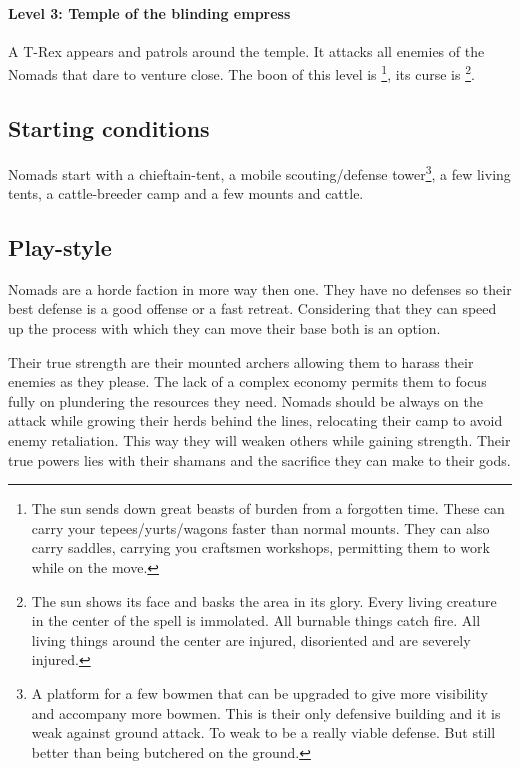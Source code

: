 \documentclass[a4paper]{book}
\begin{document}
			\paragraph{Level 3: Temple of the blinding empress}
				A T-Rex appears and patrols around the temple.
				It attacks all enemies of the \gls{Nomads} that dare to venture close.
				The boon of this level is \footnote{
					The sun sends down great beasts of burden from a forgotten time.
					These can carry your tepees/yurts/wagons faster than normal mounts.
					They can also carry saddles, carrying you craftsmen workshops,
					permitting them to work while on the move.
				},
				its curse is \footnote{
					The sun shows its face and basks the area in its glory.
					Every living creature in the center of the spell is immolated.
					All burnable things catch fire.
					All living things around the center are injured, disoriented
					and are severely injured.
				}.

	\subsection{Starting conditions}
		\Gls{Nomads} start with a chieftain-tent, a mobile scouting/defense tower\footnote{
		A platform for a few bowmen that can be upgraded to give more visibility
		and accompany more bowmen.
		This is their only defensive building and it is weak against ground attack.
		To weak to be a really viable defense.
		But still better than being butchered on the ground.
		}, a few living tents, a cattle-breeder camp and a few mounts and cattle.

	\subsection{Play-style}
		\Gls{Nomads} are a horde faction in more way then one.
		They have no defenses so their best defense is a good offense or a fast retreat.
		Considering that they can speed up the process with which they can move
		their base both is an option.

		Their true strength are their mounted archers allowing them to harass their enemies
		as they please.
		The lack of a complex economy permits them to focus fully on plundering
		the resources they need.
		\Gls{Nomads} should be always on the attack while growing their herds behind the lines,
		relocating their camp to avoid enemy retaliation.
		This way they will weaken others while gaining strength.
		Their true powers lies with their shamans and the sacrifice they can make to their gods.
\end{document}

